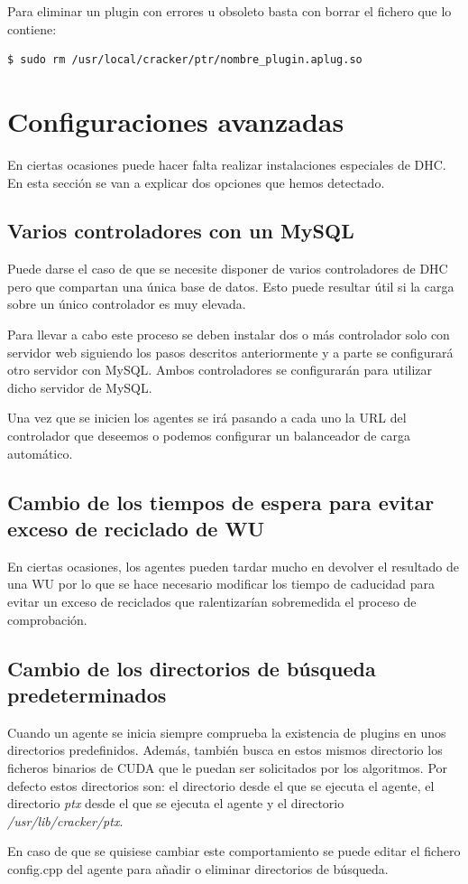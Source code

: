 Para eliminar un plugin con errores u obsoleto basta con borrar el fichero que lo contiene:

\begin{verbatim}
$ sudo rm /usr/local/cracker/ptr/nombre_plugin.aplug.so	
\end{verbatim}

\section{Configuraciones avanzadas}\label{sec:conf_avanzada}

En ciertas ocasiones puede hacer falta realizar instalaciones especiales de DHC. En esta sección se van a explicar dos opciones que hemos detectado.

\subsection{Varios controladores con un MySQL}
Puede darse el caso de que se necesite disponer de varios controladores de DHC pero que compartan una única base de datos. Esto puede resultar útil si la carga sobre un único controlador es muy elevada.

Para llevar a cabo este proceso se deben instalar dos o más controlador solo con servidor web siguiendo los pasos descritos anteriormente y a parte se configurará otro servidor con MySQL. Ambos controladores se configurarán para utilizar dicho servidor de MySQL.

Una vez que se inicien los agentes se irá pasando a cada uno la URL del controlador que deseemos o podemos configurar un balanceador de carga automático.


\subsection{Cambio de los tiempos de espera para evitar exceso de reciclado de WU}
En ciertas ocasiones, los agentes pueden tardar mucho en devolver el resultado de una WU por lo que se hace necesario modificar los tiempo de caducidad para evitar un exceso de reciclados que ralentizarían sobremedida el proceso de comprobación.

\subsection{Cambio de los directorios de búsqueda predeterminados}
Cuando un agente se inicia siempre comprueba la existencia de plugins en unos directorios predefinidos. Además, también busca en estos mismos directorio los ficheros binarios de CUDA que le puedan ser solicitados por los algoritmos. Por defecto estos directorios son: el directorio desde el que se ejecuta el agente, el directorio \emph{ptx} desde el que se ejecuta el agente y el directorio \emph{/usr/lib/cracker/ptx}.

En caso de que se quisiese cambiar este comportamiento se puede editar el fichero config.cpp del agente para añadir o eliminar directorios de búsqueda.